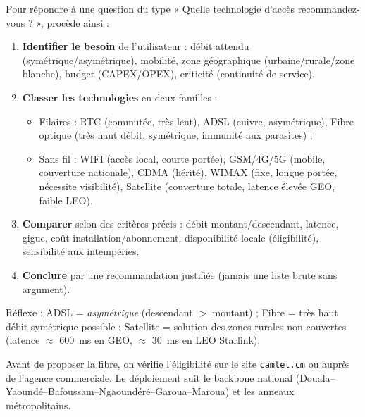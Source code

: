 \documentclass[11pt]{article}
\newcommand{\cle}[1]{{\popxbold\color{popdark}#1}}
\begin{document}
\begin{methode}
Pour répondre à une question du type « Quelle technologie d'accès recommandez-vous ? », procède ainsi :
\begin{enumerate}
\item \textbf{Identifier le besoin} de l'utilisateur : débit attendu (symétrique/asymétrique), mobilité, zone géographique (urbaine/rurale/zone blanche), budget (CAPEX/OPEX), criticité (continuité de service).
\item \textbf{Classer les technologies} en deux familles :
\begin{itemize}
\item \cle{Filaires} : RTC (commutée, très lent), ADSL (cuivre, asymétrique), Fibre optique (très haut débit, symétrique, immunité aux parasites) ;
\item \cle{Sans fil} : WIFI (accès local, courte portée), GSM/4G/5G (mobile, couverture nationale), CDMA (hérité), WIMAX (fixe, longue portée, nécessite visibilité), Satellite (couverture totale, latence élevée GEO, faible LEO).
\end{itemize}
\item \textbf{Comparer} selon des critères précis : débit montant/descendant, latence, gigue, coût installation/abonnement, disponibilité locale (éligibilité), sensibilité aux intempéries.
\item \textbf{Conclure} par une recommandation justifiée (jamais une liste brute sans argument).
\end{enumerate}
Réflexe : ADSL = \emph{asymétrique} (descendant $>$ montant) ; Fibre = très haut débit symétrique possible ; Satellite = solution des zones rurales non couvertes (latence $\approx$ \SI{600}{ms} en GEO, $\approx$ \SI{30}{ms} en LEO Starlink).
\end{methode}

\begin{exemplebox}
Avant de proposer la fibre, on vérifie l'éligibilité sur le site \texttt{camtel.cm} ou auprès de l'agence commerciale. Le déploiement suit le backbone national (Douala--Yaoundé--Bafoussam--Ngaoundéré--Garoua--Maroua) et les anneaux métropolitains.
\end{exemplebox}
\end{document}
